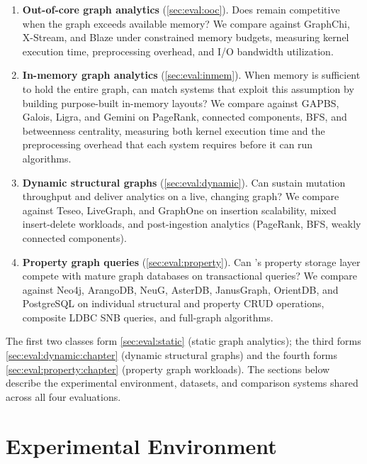 \begin{enumerate}
  \item \textbf{Out-of-core graph analytics} (\autoref{sec:eval:ooc}).
        Does \project{} remain competitive when the graph exceeds available memory?
        We compare against GraphChi, X-Stream, and Blaze under constrained memory budgets, measuring kernel execution time, preprocessing overhead, and I/O bandwidth utilization.

  \item \textbf{In-memory graph analytics} (\autoref{sec:eval:inmem}).
        When memory is sufficient to hold the entire graph, can \project{} match systems that exploit this assumption by building purpose-built in-memory layouts?
        We compare against GAPBS, Galois, Ligra, and Gemini on PageRank, connected components, BFS, and betweenness centrality, measuring both kernel execution time and the preprocessing overhead that each system requires before it can run algorithms.

  \item \textbf{Dynamic structural graphs} (\autoref{sec:eval:dynamic}).
        Can \project{} sustain mutation throughput and deliver analytics on a live, changing graph?
        We compare against Teseo, LiveGraph, and GraphOne on insertion scalability, mixed insert-delete workloads, and post-ingestion analytics (PageRank, BFS, weakly connected components).

  \item \textbf{Property graph queries} (\autoref{sec:eval:property}).
        Can \project{}'s property storage layer compete with mature graph databases on transactional queries?
        We compare against Neo4j, ArangoDB, NeuG, AsterDB, JanusGraph, OrientDB, and PostgreSQL on individual structural and property CRUD operations, composite LDBC SNB queries, and full-graph algorithms.
\end{enumerate}

\noindent
The first two classes form \autoref{sec:eval:static} (static graph analytics); the third forms \autoref{sec:eval:dynamic:chapter} (dynamic structural graphs) and the fourth forms \autoref{sec:eval:property:chapter} (property graph workloads).
The sections below describe the experimental environment, datasets, and comparison systems shared across all four evaluations.

\section{Experimental Environment}
\label{sec:eval:env}

